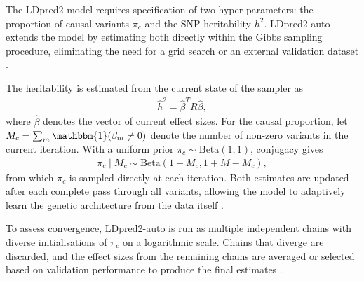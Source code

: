 The LDpred2 model requires specification of two hyper-parameters: the proportion of causal variants $\pi_c$ and the SNP heritability $h^2$. LDpred2-auto extends the model by estimating both directly within the Gibbs sampling procedure, eliminating the need for a grid search or an external validation dataset \citep{Prive2020}.

The heritability is estimated from the current state of the sampler as
\begin{align*}
\hat{h}^2 = \hat{\beta}^T R \hat{\beta},
\end{align*}
where $\hat{\beta}$ denotes the vector of current effect sizes. For the causal proportion, let $M_c = \sum_m \mathbbm{1}(\beta_m \neq 0)$ denote the number of non-zero variants in the current iteration. With a uniform prior $\pi_c \sim \text{Beta}(1,1)$, conjugacy gives
\begin{align*}
\pi_c \mid M_c \sim \text{Beta}(1 + M_c, 1 + M - M_c),
\end{align*}
from which $\pi_c$ is sampled directly at each iteration. Both estimates are updated after each complete pass through all variants, allowing the model to adaptively learn the genetic architecture from the data itself \citep{Prive2020}.

To assess convergence, LDpred2-auto is run as multiple independent chains with diverse initialisations of $\pi_c$ on a logarithmic scale. Chains that diverge are discarded, and the effect sizes from the remaining chains are averaged or selected based on validation performance to produce the final estimates \citep{Prive2020}.